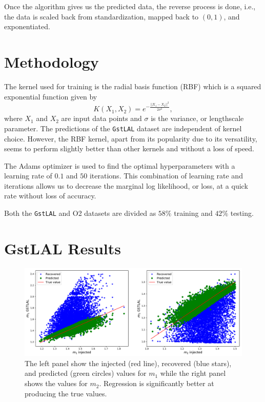 \documentclass[aps,prd,twocolumn,superscriptaddress,preprintnumbers,floatfix,nofootinbib]{revtex4-2}
\begin{document}
Once the algorithm gives us the predicted data, the reverse process is done, i.e., 
the data is scaled back from standardization, mapped back to $(0,1)$, and exponentiated. 

\section{Methodology}

The kernel used for training is the radial basis function (RBF) which is a squared
exponential function given by
\begin{equation}
K(X_1, X_2) = e^{-\frac{||X_1-X_2||^2}{2 \sigma^2}},
\end{equation}
where $X_1$ and $X_2$ are input data points and $\sigma$ is the variance, or lengthscale
parameter. The 
predictions of the \texttt{GstLAL} dataset are independent of kernel choice. However, 
the RBF kernel, apart from its popularity due to its versatility, seems to perform slightly 
better than other kernels and without a loss of speed.

The Adams optimizer is used to find the optimal hyperparameters with a learning rate of 
$0.1$ and $50$ iterations. This combination of learning rate and iterations allows us to 
decrease the marginal log likelihood, or loss, at a quick rate without loss of accuracy. 

Both the \texttt{GstLAL} and O2 datasets are divided as $58\%$ training and $42\%$ 
testing.

\section{GstLAL Results}

\begin{figure}[!h]
	\centering
	\includegraphics[width=\linewidth]{m1_m2_comparisons}
	\caption{%
	 		The left panel show the injected (red line), recovered (blue stars), and 
			predicted (green circles) values for $m_1$ while the right panel shows the 
			values for $m_2$. Regression is significantly better at producing the true 
			values.}
	\label{fig:regression}
\end{figure}
\end{document}
